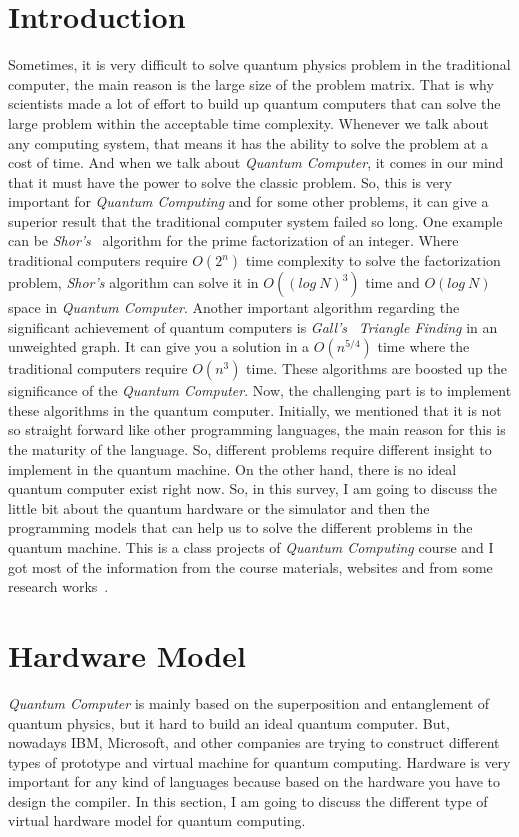 \documentclass[11pt, conference, onecolumn]{IEEEtran}
\begin{document}
\section{Introduction}
Sometimes, it is very difficult to solve quantum physics problem in the traditional computer, the main reason is the large size of the problem matrix. 
That is why scientists made a lot of effort to build up quantum computers that can solve the large problem within the acceptable time complexity.
Whenever we talk about any computing system, that means it has the ability to solve the problem at a cost of time. And when we talk about 
\textit{Quantum Computer}, it comes in our mind that it must have the power to solve the classic problem.  So, this is very important 
for \textit{Quantum Computing} and for some other problems, it can give a superior result that the traditional computer system failed so long.
One example can be \textit{Shor's}~\cite{shor1994algorithms} algorithm for the prime factorization of an integer. Where traditional computers require 
$O(2^n)$ time complexity to solve the factorization problem, \textit{Shor's} algorithm can solve it in $O((log\ N)^3)$ time and $O(log\ N)$ space in 
\textit{Quantum Computer}. Another important algorithm regarding the significant achievement of quantum computers is \textit{Gall's}~\cite{gall2014improved} \textit{Triangle Finding} 
in an unweighted graph. It can give you a solution in a $O(n^{5/4})$ time where the traditional computers require $O(n^3)$ time. These algorithms are boosted up the 
significance of the \textit{Quantum Computer}. Now, the challenging part is to implement these algorithms in the  quantum computer. Initially, we mentioned that 
it is not so straight forward like other programming languages, the main reason for this is the maturity of the language. So, different problems require different 
insight to implement in the quantum machine. On the other hand, there is no ideal quantum computer exist right now. So, in this survey, I am going to discuss 
the little bit about the quantum hardware or the simulator and then the programming models that can help us to solve the different problems in the quantum machine. 
This is a class projects of \textit{Quantum Computing} course and I got most of the information from the course materials, websites and from some research works~\cite{selinger2004brief}.  
  
\section{Hardware Model}
\textit{Quantum Computer} is mainly based on the superposition and entanglement of quantum physics, but it hard to build an ideal quantum computer. But, nowadays IBM, Microsoft, 
and other companies are trying to construct different types of prototype and virtual machine for quantum computing. Hardware is very important for any kind of languages because 
based on the hardware you have to design the compiler. In this section, I am going to discuss the different type of virtual hardware model for quantum computing. 
\end{document}
